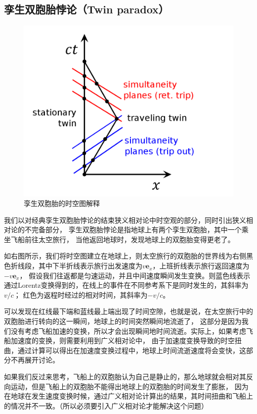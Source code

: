 \documentclass[12pt, a4paper, oneside]{ctexart}
\numberwithin{equation}{section}  %
\def\bd{\boldsymbol}        %
\begin{document}
\subsection{孪生双胞胎悖论（Twin paradox）}

{ %
\begin{figure} %
    \vspace{-4em}
    \includegraphics[scale=0.3]{Twin_Paradox_Minkowski_Diagram.png}
    \caption{孪生双胞胎的时空图解释}
\end{figure}
我们以对经典孪生双胞胎悖论的结束狭义相对论中时空观的部分，同时引出狭义相对论的不完备部分，
孪生双胞胎悖论是指地球上有两个孪生双胞胎，其中一个乘坐飞船前往太空旅行，
当他返回地球时，发现地球上的双胞胎变得更老了。

如右图所示，我们将时空图建立在地球上，则太空旅行的双胞胎的世界线为右侧黑色折线段，其中下半折线表示旅行出发速度为$v\bd{e}_x$，上班折线表示旅行返回速度为$-v\bd{e}_x$，
假设我们往返都是匀速运动，并且中间速度瞬间发生变换。则蓝色线表示通过Lorentz变换得到的，在线上的事件在不同参考系下是同时发生的，其斜率为$v/c$；
红色为返程时经过的相对时间，其斜率为$-v/c$。

可以发现在红线最下端和蓝线最上端出现了时间空隙，也就是说，在太空旅行中的双胞胎进行转向的这一瞬间，地球上的时间突然瞬间地流逝了，
这部分是因为我们没有考虑飞船加速的变换，所以才会出现瞬间地时间流逝。实际上，如果考虑飞船加速度的变换，则需要利用到广义相对论中，
由于加速度变换导致的时空扭曲，通过计算可以得出在加速度变换过程中，地球上时间流逝速度将会变快，这部分不再展开讨论。

如果我们反过来思考，飞船上的双胞胎认为自己是静止的，那么地球就会相对其反向运动，但是飞船上的双胞胎不能得出地球上的双胞胎的时间发生了膨胀，
因为在地球在发生速度变换时候，通过广义相对论计算出的结果，其时间扭曲和飞船上的情况并不一致。（所以必须要引入广义相对论才能解决这个问题）
}
\end{document}
